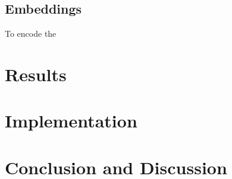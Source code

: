 \documentclass{article}
\begin{document}
	\subsection{Embeddings}
	To encode the 
	
	\section{Results}
	
	\section{Implementation}
	
	\section{Conclusion and Discussion}
	
\end{document}
